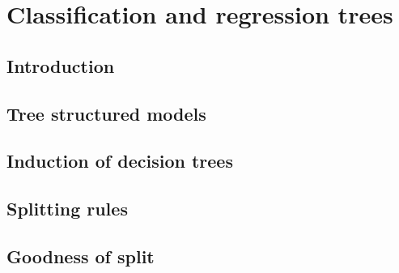 \chapter{Classification and regression trees}\label{ch:cart}

\section{Introduction}


\section{Tree structured models}


\section{Induction of decision trees}


\section{Splitting rules}


\section{Goodness of split}

